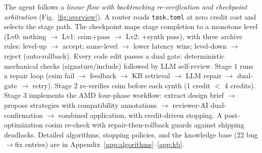 \documentclass[10pt,conference,letterpaper]{IEEEtran}
\begin{document}
The agent follows a \emph{linear flow with backtracking re-verification and checkpoint arbitration} (Fig.~\ref{fig:overview}). A router reads \texttt{task.toml} at zero credit cost and selects the stage path. The checkpoint maps stage completion to a monotone level (Lv0: nothing $\to$ Lv1: csim+pass $\to$ Lv2: +synth pass), with three archive rules: level-up $\to$ accept; same-level $\to$ lower latency wins; level-down $\to$ reject (auto-rollback). Every code edit passes a dual gate: deterministic mechanical checks (signature/include) followed by LLM self-review. Stage 1 runs a repair loop (csim fail $\to$ feedback $\to$ KB retrieval $\to$ LLM repair $\to$ dual-gate $\to$ retry). Stage 2 re-verifies csim before each synth (1 credit $<$ 4 credits). Stage 3 implements the AMD four-phase workflow: extract design brief $\to$ propose strategies with compatibility annotations $\to$ reviewer-AI dual-confirmation $\to$ combined application, with credit-driven stopping. A post-optimization cosim re-check with repair-then-rollback guards against shipping deadlocks. Detailed algorithms, stopping policies, and the knowledge base (22 bug$\to$fix entries) are in Appendix~\ref{app:algorithms}--\ref{app:kb}.
\end{document}
